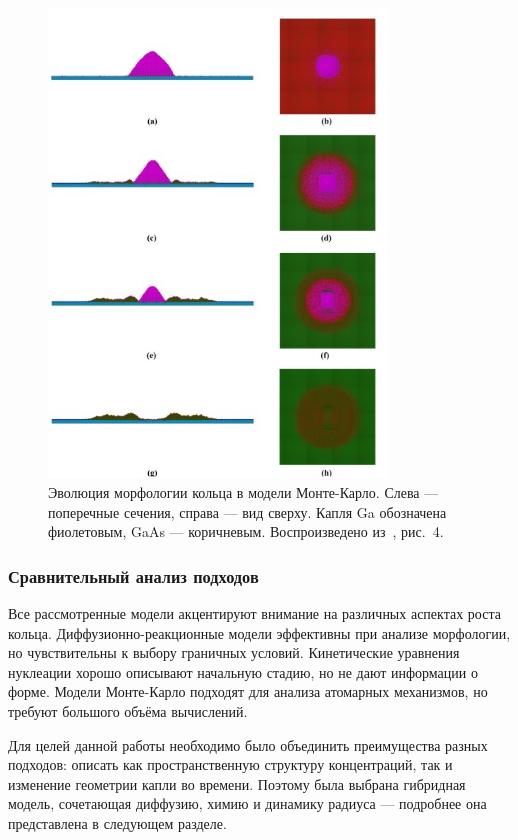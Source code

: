 \documentclass[14pt,oneside]{extarticle}
\begin{document}
\begin{figure}[H]
    \begin{center}
        \includegraphics[width=9cm]{images/shwartz_fig4.png}
        \caption{\label{fig:shwartz4}
            Эволюция морфологии кольца в модели Монте-Карло. Слева — поперечные сечения, справа — вид сверху. Капля Ga обозначена фиолетовым, GaAs — коричневым. Воспроизведено из~\cite{shwartz2018}, рис.~4.}
    \end{center}
\end{figure}

\subsubsection*{Сравнительный анализ подходов}
Все рассмотренные модели акцентируют внимание на различных аспектах роста кольца. Диффузионно-реакционные модели эффективны при анализе морфологии, но чувствительны к выбору граничных условий. Кинетические уравнения нуклеации хорошо описывают начальную стадию, но не дают информации о форме. Модели Монте-Карло подходят для анализа атомарных механизмов, но требуют большого объёма вычислений.

Для целей данной работы необходимо было объединить преимущества разных подходов: описать как пространственную структуру концентраций, так и изменение геометрии капли во времени. Поэтому была выбрана гибридная модель, сочетающая диффузию, химию и динамику радиуса — подробнее она представлена в следующем разделе.
\end{document}
